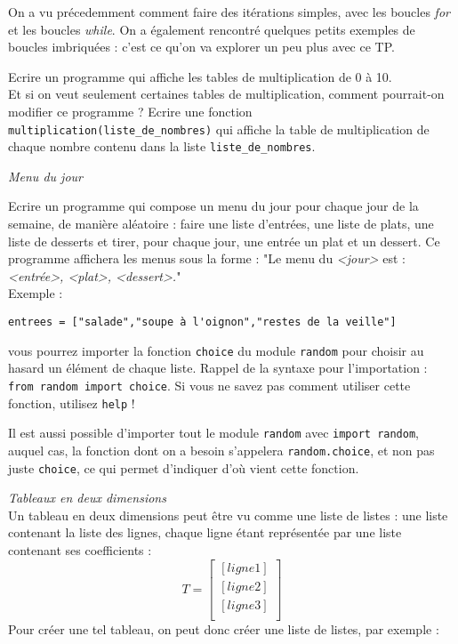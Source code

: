 

On a vu précedemment comment faire des itérations simples, avec les boucles \textit{for} et les boucles \textit{while}. On a également rencontré quelques petits exemples de boucles imbriquées : c'est ce qu'on va explorer un peu plus avec ce TP.

\exo
\ques Ecrire un programme qui affiche les tables de multiplication de 0 à 10. \\
 Et si on veut seulement certaines tables de multiplication, comment pourrait-on modifier ce programme ? Ecrire une fonction \texttt{multiplication(liste\_de\_nombres)} qui affiche la table de multiplication de chaque nombre contenu dans la liste \texttt{liste\_de\_nombres}.

\ques \textit{Menu du jour}

Ecrire un programme qui compose un menu du jour pour chaque jour de la semaine, de manière aléatoire : faire une liste d'entrées, une liste de plats, une liste de desserts et tirer, pour chaque jour, une entrée un plat et un dessert. Ce programme affichera les menus sous la forme : "Le menu du \textit{<jour>} est : \textit{<entrée>, <plat>, <dessert>.}"\\

Exemple :
\begin{verbatim}
entrees = ["salade","soupe à l'oignon","restes de la veille"]
\end{verbatim}

 vous pourrez importer la fonction \texttt{choice} du module \texttt{random} pour choisir au hasard un élément de chaque liste. Rappel de la syntaxe pour l'importation : \texttt{from random import choice}. Si vous ne savez pas comment utiliser cette fonction, utilisez \texttt{help} !

Il est aussi possible d'importer tout le module \texttt{random} avec \texttt{import random}, auquel cas, la fonction dont on a besoin s'appelera \texttt{random.choice}, et non pas juste \texttt{choice}, ce qui permet d'indiquer d'où vient cette fonction.

\exo

\ques \textit{Tableaux en deux dimensions}\\
	Un tableau en deux dimensions peut être vu comme une liste de listes : une liste contenant la liste des lignes, chaque ligne étant représentée par une liste contenant ses coefficients : \[
		T = \begin{bmatrix}
			[ligne 1] \\
			[ligne 2] \\
			[ligne 3] \\
		\end{bmatrix}
	\]
	Pour créer une tel tableau, on peut donc créer une liste de listes, par exemple :

